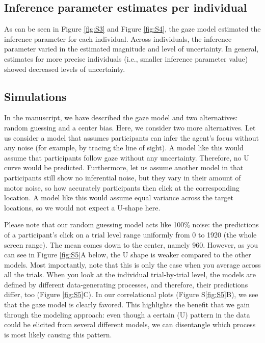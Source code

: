 \documentclass[
  man,floatsintext]{apa7}
\begin{document}
\subsection{Inference parameter estimates per individual}\label{inference-parameter-estimates-per-individual}

As can be seen in Figure \ref{fig:S3} and Figure \ref{fig:S4}, the gaze model estimated the inference parameter for each individual. Across individuals, the inference parameter varied in the estimated magnitude and level of uncertainty. In general, estimates for more precise individuals (i.e., smaller inference parameter value) showed decreased levels of uncertainty.

\newpage

\subsection{Simulations}\label{simulations}

In the manuscript, we have described the gaze model and two alternatives: random guessing and a center bias. Here, we consider two more alternatives. Let us consider a model that assumes participants can infer the agent's focus without any noise (for example, by tracing the line of sight). A model like this would assume that participants follow gaze without any uncertainty. Therefore, no U curve would be predicted.
Furthermore, let us assume another model in that participants still show no inferential noise, but they vary in their amount of motor noise, so how accurately participants then click at the corresponding location. A model like this would assume equal variance across the target locations, so we would not expect a U-shape here.

Please note that our random guessing model acts like 100\% noise: the predictions of a participant's click on a trial level range uniformly from 0 to 1920 (the whole screen range). The mean comes down to the center, namely 960. However, as you can see in Figure \ref{fig:S5}A below, the U shape is weaker compared to the other models. Most importantly, note that this is only the case when you average across all the trials. When you look at the individual trial-by-trial level, the models are defined by different data-generating processes, and therefore, their predictions differ, too (Figure \ref{fig:S5}C). In our correlational plots (Figure S\ref{fig:S5}B), we see that the gaze model is clearly favored. This highlights the benefit that we gain through the modeling approach: even though a certain (U) pattern in the data could be elicited from several different models, we can disentangle which process is most likely causing this pattern.
\end{document}
